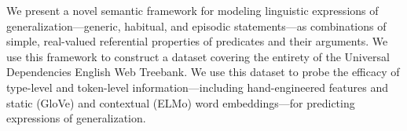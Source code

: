 We present a novel semantic framework for modeling linguistic expressions of generalization---generic, habitual, and episodic statements---as combinations of simple, real-valued referential properties of predicates and their arguments. We use this framework to construct a dataset covering the entirety of the Universal Dependencies English Web Treebank. We use this dataset to probe the efficacy of type-level and token-level information---including hand-engineered features and static (GloVe) and contextual (ELMo) word embeddings---for predicting expressions of generalization.